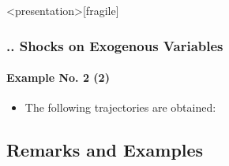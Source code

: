 \documentclass[11pt,aspectratio=169]{beamer}
\begin{document}
\begin{frame}<presentation>[fragile]
	\frametitle{{\thesection.\thesubsection.\thesubsubsection} Shocks on Exogenous Variables}
	\framesubtitle{Example No. 2 (2)}
	\begin{itemize}
		\item The following trajectories are obtained:
		\begin{figure}
			\centering
			\qquad
			\qquad
		\end{figure}
	\end{itemize}
\end{frame}
\subsection{Remarks and Examples}
\end{document}
